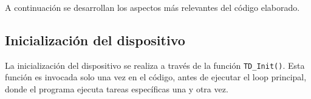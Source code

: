 A continuación se desarrollan los aspectos más relevantes del código elaborado.

\subsection{Inicialización del dispositivo}
	La inicialización del dispositivo se realiza a través de la función \verb|TD_Init()|. Esta función es invocada solo una vez en el código, antes de ejecutar el loop principal, donde el programa ejecuta tareas específicas una y otra vez.\\	
	